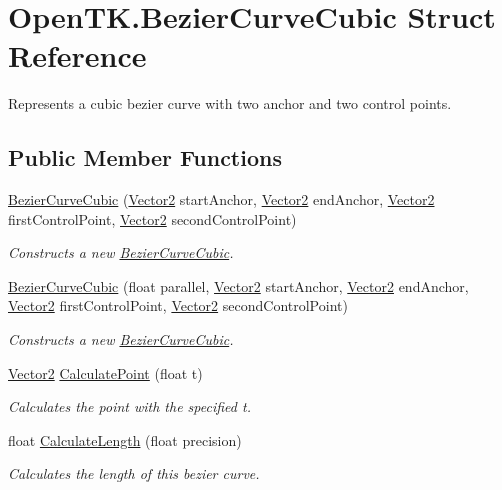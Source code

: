 \hypertarget{struct_open_t_k_1_1_bezier_curve_cubic}{\section{Open\-T\-K.\-Bezier\-Curve\-Cubic Struct Reference}
\label{struct_open_t_k_1_1_bezier_curve_cubic}
}


Represents a cubic bezier curve with two anchor and two control points.  


\subsection*{Public Member Functions}
\begin{DoxyCompactItemize}
\item 
\hyperlink{struct_open_t_k_1_1_bezier_curve_cubic_a12915e85a0b2b00607c763120fb1c7a4}{Bezier\-Curve\-Cubic} (\hyperlink{struct_open_t_k_1_1_vector2}{Vector2} start\-Anchor, \hyperlink{struct_open_t_k_1_1_vector2}{Vector2} end\-Anchor, \hyperlink{struct_open_t_k_1_1_vector2}{Vector2} first\-Control\-Point, \hyperlink{struct_open_t_k_1_1_vector2}{Vector2} second\-Control\-Point)
\begin{DoxyCompactList}\small\item\em Constructs a new \hyperlink{struct_open_t_k_1_1_bezier_curve_cubic}{Bezier\-Curve\-Cubic}. \end{DoxyCompactList}\item 
\hyperlink{struct_open_t_k_1_1_bezier_curve_cubic_ab57d55cfffe00a55fabd06f9580cda01}{Bezier\-Curve\-Cubic} (float parallel, \hyperlink{struct_open_t_k_1_1_vector2}{Vector2} start\-Anchor, \hyperlink{struct_open_t_k_1_1_vector2}{Vector2} end\-Anchor, \hyperlink{struct_open_t_k_1_1_vector2}{Vector2} first\-Control\-Point, \hyperlink{struct_open_t_k_1_1_vector2}{Vector2} second\-Control\-Point)
\begin{DoxyCompactList}\small\item\em Constructs a new \hyperlink{struct_open_t_k_1_1_bezier_curve_cubic}{Bezier\-Curve\-Cubic}. \end{DoxyCompactList}\item 
\hyperlink{struct_open_t_k_1_1_vector2}{Vector2} \hyperlink{struct_open_t_k_1_1_bezier_curve_cubic_a1677b71f53c424532c4e08b3bf21b732}{Calculate\-Point} (float t)
\begin{DoxyCompactList}\small\item\em Calculates the point with the specified t. \end{DoxyCompactList}\item 
float \hyperlink{struct_open_t_k_1_1_bezier_curve_cubic_a37f531f056bb9960c4bdf68cca8d9dcb}{Calculate\-Length} (float precision)
\begin{DoxyCompactList}\small\item\em Calculates the length of this bezier curve. \end{DoxyCompactList}\end{DoxyCompactItemize}
